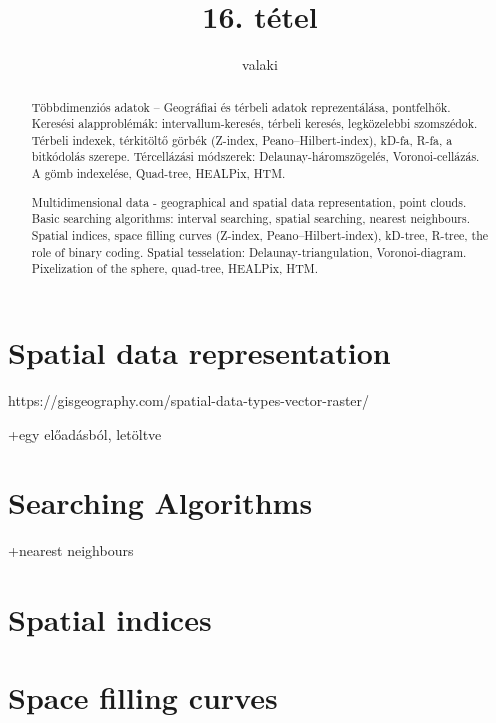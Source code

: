 \documentclass[12pt]{article}
\theoremstyle{plain}
\begin{document}
\title{16. tétel}
\author{valaki}

\maketitle


\newpage
\begin{abstract}
    Többdimenziós adatok – Geográfiai és térbeli adatok reprezentálása, pontfelhők. Keresési alapproblémák: intervallum-keresés, térbeli keresés, legközelebbi szomszédok. Térbeli indexek, térkitöltő görbék (Z-index, Peano–Hilbert-index), kD-fa, R-fa, a bitkódolás szerepe. Tércellázási módszerek: Delaunay-háromszögelés, Voronoi-cellázás. A gömb indexelése, Quad-tree, HEALPix, HTM.
    
    Multidimensional data - geographical and spatial data representation, point clouds. Basic searching algorithms: interval searching, spatial searching, nearest neighbours. Spatial indices, space filling curves (Z-index, Peano–Hilbert-index), kD-tree, R-tree, the role of binary coding. Spatial tesselation: Delaunay-triangulation, Voronoi-diagram. Pixelization of the sphere, quad-tree, HEALPix, HTM.
\end{abstract}


\section{Spatial data representation}
https://gisgeography.com/spatial-data-types-vector-raster/

+egy előadásból, letöltve


\section{Searching Algorithms}


+nearest neighbours

\section{Spatial indices}

\section{Space filling curves}
\end{document}
